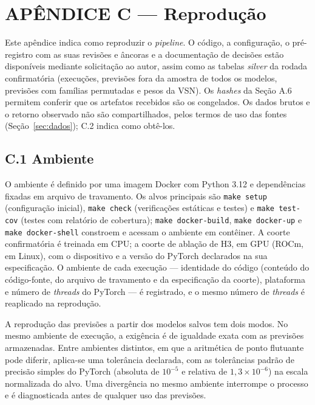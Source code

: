 \chapter*{APÊNDICE C --- Reprodução}

Este apêndice indica como reproduzir o \textit{pipeline}. O código, a configuração, o pré-registro com as suas revisões e âncoras e a documentação de decisões estão disponíveis mediante solicitação ao autor, assim como as tabelas \textit{silver} da rodada confirmatória (execuções, previsões fora da amostra de todos os modelos, previsões com famílias permutadas e pesos da VSN). Os \textit{hashes} da Seção A.6 permitem conferir que os artefatos recebidos são os congelados. Os dados brutos e o retorno observado não são compartilhados, pelos termos de uso das fontes (Seção~\ref{sec:dados}); C.2 indica como obtê-los.

\section*{C.1 Ambiente}

O ambiente é definido por uma imagem Docker com Python 3.12 e dependências fixadas em arquivo de travamento. Os alvos principais são \texttt{make setup} (configuração inicial), \texttt{make check} (verificações estáticas e testes) e \texttt{make test-cov} (testes com relatório de cobertura); \texttt{make docker-build}, \texttt{make docker-up} e \texttt{make docker-shell} constroem e acessam o ambiente em contêiner. A coorte confirmatória é treinada em CPU; a coorte de ablação de H3, em GPU (ROCm, em Linux), com o dispositivo e a versão do PyTorch declarados na sua especificação. O ambiente de cada execução --- identidade do código (conteúdo do código-fonte, do arquivo de travamento e da especificação da coorte), plataforma e número de \textit{threads} do PyTorch --- é registrado, e o mesmo número de \textit{threads} é reaplicado na reprodução.

A reprodução das previsões a partir dos modelos salvos tem dois modos. No mesmo ambiente de execução, a exigência é de igualdade exata com as previsões armazenadas. Entre ambientes distintos, em que a aritmética de ponto flutuante pode diferir, aplica-se uma tolerância declarada, com as tolerâncias padrão de precisão simples do PyTorch (absoluta de \(10^{-5}\) e relativa de \(1{,}3 \times 10^{-6}\)) na escala normalizada do alvo. Uma divergência no mesmo ambiente interrompe o processo e é diagnosticada antes de qualquer uso das previsões.

